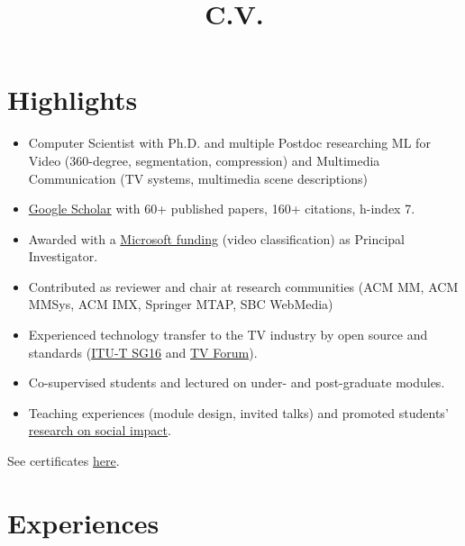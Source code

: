 \documentclass[10pt,a4paper,sans,colorlinks]{moderncv}
\title{C.V.}
\begin{document}
\setHyperrefBlueLinks
\makecvtitle
\vspace{-2em}

\section{Highlights}

\begin{itemize}
    \item Computer Scientist with Ph.D. and multiple Postdoc researching ML for Video (360-degree, segmentation, compression) and Multimedia Communication (TV systems, multimedia scene descriptions)
    \item \href{https://scholar.google.com/citations?user=1bEOmkUAAAAJ&hl=en}{Google Scholar} with 60+ published papers, 160+ citations, h-index 7.
    \item Awarded with a \href{https://www.rnp.br/en/rnp-and-microsoft-challenge-artificial-intelligence}{Microsoft funding} (video classification) as Principal Investigator.
    \item Contributed as reviewer and chair at research communities (ACM MM, ACM MMSys, ACM IMX, Springer MTAP, SBC WebMedia)
    \item Experienced technology transfer to the TV industry by open source and standards (\href{http://www.itu.int/en/ITU-T/studygroups/2022-2024/16}{ITU-T SG16} and \href{http://forumsbtvd.org.br}{TV Forum}).
    \item Co-supervised students and lectured on under- and post-graduate modules.
    \item Teaching experiences (module design, invited talks) and promoted students' \href{https://webmedia.org.br/2022/en/lf-award/}{research on social impact}.
\end{itemize}

See certificates \href{https://alanlivio.github.io/certificates.pdf}{here}.

\section{Experiences}
\end{document}
